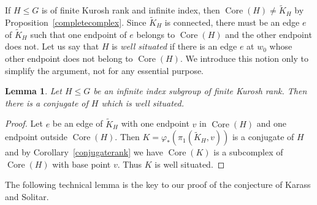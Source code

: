 \documentclass[11pt,reqno]{amsart}
\newtheorem{Lemma}[Thm]{Lemma}
\begin{document}
If $H\leq G$ is of finite Kurosh rank and infinite index, then ${\mathop{\mathrm{Core}}\nolimits}(H)\neq {\ensuremath{\widetilde {K}}}_H$ by Proposition~\ref{completecomplex}.  Since ${\ensuremath{\widetilde {K}}}_H$ is connected, there must be an edge $e$ of ${\ensuremath{\widetilde {K}}}_H$ such that one endpoint of $e$ belongs to ${\mathop{\mathrm{Core}}\nolimits}(H)$ and the other endpoint does not.  Let us say that $H$ is \emph{well situated} if there is an edge $e$ at $w_0$ whose other endpoint does not belong to ${\mathop{\mathrm{Core}}\nolimits}(H)$. We introduce this notion only to simplify the argument, not for any essential purpose.

\begin{Lemma}\label{wellsituated}
Let $H\leq G$ be an infinite index subgroup of finite Kurosh rank.  Then there is a conjugate of $H$ which is well situated.
\end{Lemma}
\begin{proof}
Let $e$ be an edge of ${\ensuremath{\widetilde {K}}}_H$ with one endpoint $v$ in ${\mathop{\mathrm{Core}}\nolimits}(H)$ and one endpoint outside ${\mathop{\mathrm{Core}}\nolimits}(H)$.  Then $K={\varphi}_*(\pi_1({\ensuremath{\widetilde {K}}}_H,v))$ is a conjugate of $H$ and by Corollary~\ref{conjugaterank} we have ${\mathop{\mathrm{Core}}\nolimits}(K)$ is a subcomplex of ${\mathop{\mathrm{Core}}\nolimits}(H)$ with base point $v$.  Thus $K$ is well situated.
\end{proof}

The following technical lemma is the key to our proof of the conjecture of Karass and Solitar.
\end{document}
